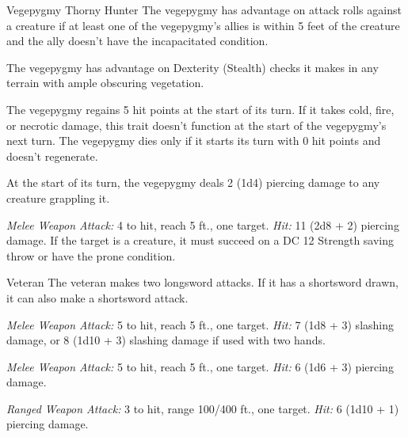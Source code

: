 \documentclass[10pt,a4paper,twoside,bg=print,twocolumn,openany,nodeprecatedcode]{dndbook}
\begin{document}
\begin{DndMonster}[float=t]{Vegepygmy Thorny Hunter}
\DndMonsterBasics[
armor-class = {14 (natural armor)},
hit-points = {\DndDice{5d8 + 5}},
speed = {40 ft.}
]
\DndMonsterAbilityScores[
 str = 15,
 dex = 14,
 con = 13,
 int = 2,
 wis = 10,
 cha = 6
]
\DndMonsterDetails[
skills = {Perception +4, Stealth +4, Survival +4},
damage-resistances = {lightning, piercing},
senses = {darkvision 60 ft., passive perception 14},
challenge = 2,
]
The vegepygmy has advantage on attack rolls against a creature if at least one of the vegepygmy's allies is within 5 feet of the creature and the ally doesn't have the incapacitated condition.

The vegepygmy has advantage on Dexterity (Stealth) checks it makes in any terrain with ample obscuring vegetation.

The vegepygmy regains 5 hit points at the start of its turn. If it takes cold, fire, or necrotic damage, this trait doesn't function at the start of the vegepygmy's next turn. The vegepygmy dies only if it starts its turn with 0 hit points and doesn't regenerate.

At the start of its turn, the vegepygmy deals 2 (1d4) piercing damage to any creature grappling it.

\textsl{Melee Weapon Attack:} 4 to hit, reach 5 ft., one target. \textsl{Hit:} 11 (2d8 + 2) piercing damage. If the target is a creature, it must succeed on a DC 12 Strength saving throw or have the prone condition.

\end{DndMonster}



\begin{DndMonster}[float=t]{Veteran}
\DndMonsterBasics[
armor-class = {17 (\textit{splint armor})},
hit-points = {\DndDice{9d8 + 18}},
speed = {30 ft.}
]
\DndMonsterAbilityScores[
 str = 16,
 dex = 13,
 con = 14,
 int = 10,
 wis = 11,
 cha = 10
]
\DndMonsterDetails[
skills = {Athletics +5, Perception +2},
languages = {any one language (usually Common)},
challenge = 3,
]
The veteran makes two longsword attacks. If it has a shortsword drawn, it can also make a shortsword attack.

\textsl{Melee Weapon Attack:} 5 to hit, reach 5 ft., one target. \textsl{Hit:} 7 (1d8 + 3) slashing damage, or 8 (1d10 + 3) slashing damage if used with two hands.

\textsl{Melee Weapon Attack:} 5 to hit, reach 5 ft., one target. \textsl{Hit:} 6 (1d6 + 3) piercing damage.

\textsl{Ranged Weapon Attack:} 3 to hit, range 100/400 ft., one target. \textsl{Hit:} 6 (1d10 + 1) piercing damage.

\end{DndMonster}
\end{document}
